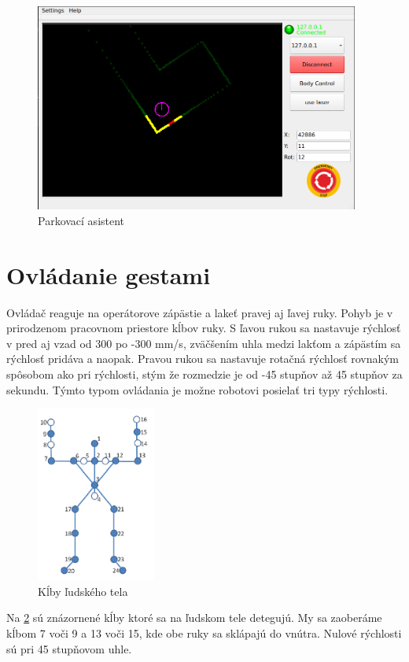 \begin{figure}[!htbp]
	\begin{center}
		\includegraphics[width=0.95\textwidth]{img/parking_camera.png}
	\end{center}
	\caption{Parkovací asistent}
	\label{fig:parking}
\end{figure}

\section{Ovládanie gestami}

Ovládač reaguje na operátorove zápästie a lakeť pravej aj ľavej ruky. Pohyb je v prirodzenom pracovnom priestore kĺbov ruky.
S ľavou rukou sa nastavuje rýchlosť v pred aj vzad od 300 po -300 mm/s, zväčšením uhla medzi lakťom a zápästím sa rýchlosť pridáva a naopak.
Pravou rukou sa nastavuje rotačná rýchlosť rovnakým spôsobom ako pri rýchlosti, stým že rozmedzie je od -45 stupňov až 45 stupňov za sekundu.
Týmto typom ovládania je možne robotovi posielať tri typy rýchlosti. 

\begin{figure}[!htbp]
	\begin{center}
		\includegraphics[width=0.35\textwidth]{img/skeleton.png}
	\end{center}
	\caption{Kĺby ľudského tela}
	\label{fig:skeleton}
\end{figure}

\newpage

Na \ref{fig:skeleton} sú znázornené kĺby ktoré sa na ľudskom tele detegujú. My sa zaoberáme kĺbom 7 voči 9 a 13 voči 15, kde obe ruky
sa sklápajú do vnútra. Nulové rýchlosti sú pri 45 stupňovom uhle.

